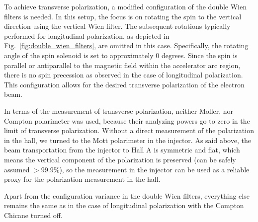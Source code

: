 To achieve transverse polarization, a modified configuration of the double 
Wien filters is needed. In this setup, the focus is on rotating the spin to the vertical direction using the vertical Wien filter. The subsequent rotations typically performed for longitudinal polarization, as depicted in Fig.~\ref{fig:double_wien_filters}, are omitted in this case. Specifically, the rotating angle of the spin solenoid is set to approximately 0 degrees.
Since the spin is parallel or antiparallel to the magnetic field within the accelerator arc region, there is no spin precession as observed in the case of longitudinal polarization. This configuration allows for the desired transverse polarization of the electron beam.

In terms of the measurement of transverse polarization, neither Moller, nor Compton
polarimeter was used, because their analyzing powers go to zero in the limit of transverse
polarization. Without a direct measurement of the polarization in the hall, 
we turned to the Mott polarimeter in the injector. 
As said above, the beam transportation from the injector to Hall A
is symmetric and flat, which means the vertical component of the polarization
is preserved (can be safely assumed $>99.9\%$), so the measurement in the
injector can be used as a reliable proxy for the polarization measurement in the hall.

Apart from the configuration variance in the double Wien filters, everything 
else remains the same as in the case of longitudinal polarization with the Compton Chicane
turned off. 

